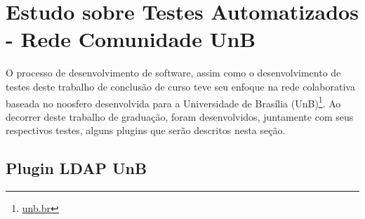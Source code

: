 
\section {Estudo sobre Testes Automatizados - Rede Comunidade UnB}

O processo de desenvolvimento de software, assim como o desenvolvimento de testes 
deste trabalho de conclusão de curso teve seu enfoque na rede colaborativa baseada 
no noosfero desenvolvida para a Universidade de Brasília (UnB)\footnote{\url{unb.br}}. Ao decorrer deste trabalho de graduação, foram desenvolvidos, juntamente com seus respectivos testes, alguns plugins que serão descritos nesta seção.

\subsection{Plugin LDAP UnB}

